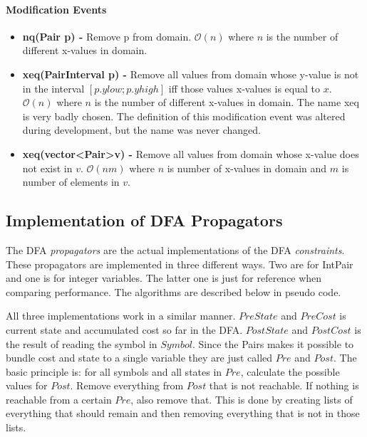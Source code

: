 \documentclass[a4paper,11pt]{article}
\begin{document}
\paragraph{Modification Events}
\begin{itemize}
\item {\textbf{nq(Pair p) - }} Remove p from domain. $\mathcal{O}(n)$ where $n$ is the number of different x-values in domain.

\item{\textbf{xeq(PairInterval p) - }} Remove all values from domain whose y-value is not in the interval $[p.ylow; p.yhigh]$ iff those values x-values is equal to $x$. $\mathcal{O}(n)$ where $n$ is the number of different x-values in domain. The name xeq is very badly chosen. The definition of this modification event was altered during development, but the name was never changed.

\item{\textbf{xeq(vector\textless Pair\textgreater v) - }} Remove all values from domain whose x-value does not exist in $v$. $\mathcal{O}(nm)$ where $n$ is number of x-values in domain and $m$ is number of elements in $v$.

\end{itemize}

\subsection{Implementation of DFA Propagators}
The DFA \textit{propagators} are the actual implementations of the DFA \textit{constraints}. These propagators are implemented in three different ways. Two are for IntPair and one is for integer variables. The latter one is just for reference when comparing performance. The algorithms are described below in pseudo code.

All three implementations work in a similar manner. $PreState$ and $PreCost$ is current state and accumulated cost so far in the DFA. $PostState$ and $PostCost$ is the result of reading the symbol in $Symbol$. Since the Pairs makes it possible to bundle cost and state to a single variable they are just called $Pre$ and $Post$. The basic principle is: for all symbols and all states in $Pre$, calculate the possible values for $Post$. Remove everything from $Post$ that is not reachable. If nothing is reachable from a certain $Pre$, also remove that. This is done by creating lists of everything that should remain and then removing everything that is not in those lists.
\end{document}
